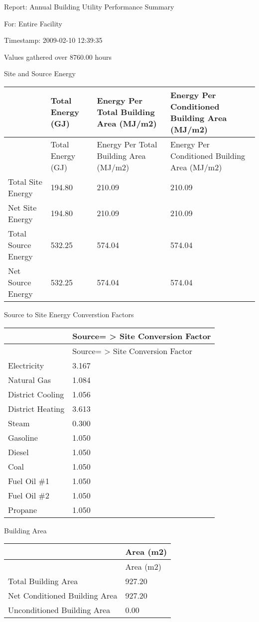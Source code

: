 Report: Annual Building Utility Performance Summary

For: Entire Facility

Timestamp: 2009-02-10 12:39:35

Values gathered over 8760.00 hours

Site and Source Energy

\begin{longtable}[c]{>{\raggedright}p{1.5in}>{\raggedright}p{1.5in}>{\raggedright}p{1.5in}>{\raggedright}p{1.5in}}
\toprule 
~ & Total Energy (GJ) & Energy Per Total Building Area (MJ/m2) & Energy Per Conditioned Building Area (MJ/m2) \tabularnewline
\midrule
\endfirsthead

\toprule 
~ & Total Energy (GJ) & Energy Per Total Building Area (MJ/m2) & Energy Per Conditioned Building Area (MJ/m2) \tabularnewline
\midrule
\endhead

Total Site Energy & 194.80 & 210.09 & 210.09 \tabularnewline
Net Site Energy & 194.80 & 210.09 & 210.09 \tabularnewline
Total Source Energy & 532.25 & 574.04 & 574.04 \tabularnewline
Net Source Energy & 532.25 & 574.04 & 574.04 \tabularnewline
\bottomrule
\end{longtable}

Source to Site Energy Converstion Factors

\begin{longtable}[c]{@{}ll@{}}
\toprule 
~ & Source= > Site Conversion Factor \tabularnewline
\midrule
\endfirsthead

\toprule 
~ & Source= > Site Conversion Factor \tabularnewline
\midrule
\endhead

Electricity & 3.167 \tabularnewline
Natural Gas & 1.084 \tabularnewline
District Cooling & 1.056 \tabularnewline
District Heating & 3.613 \tabularnewline
Steam & 0.300 \tabularnewline
Gasoline & 1.050 \tabularnewline
Diesel & 1.050 \tabularnewline
Coal & 1.050 \tabularnewline
Fuel Oil \#1 & 1.050 \tabularnewline
Fuel Oil \#2 & 1.050 \tabularnewline
Propane & 1.050 \tabularnewline
\bottomrule
\end{longtable}

Building Area

\begin{longtable}[c]{@{}ll@{}}
\toprule 
~ & Area (m2) \tabularnewline
\midrule
\endfirsthead

\toprule 
~ & Area (m2) \tabularnewline
\midrule
\endhead

Total Building Area & 927.20 \tabularnewline
Net Conditioned Building Area & 927.20 \tabularnewline
Unconditioned Building Area & 0.00 \tabularnewline
\bottomrule
\end{longtable}

